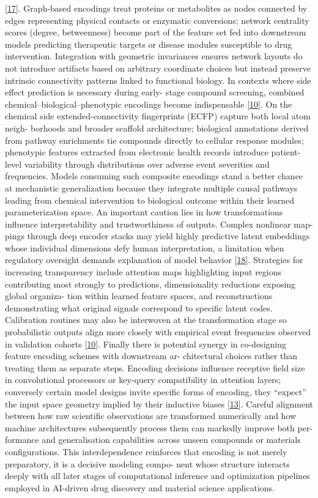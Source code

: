\documentclass[
]{article}
\begin{document}
{[}\hyperref[_bookmark57]{17}{]}. Graph-based encodings treat proteins
or metabolites as nodes connected by edges representing physical
contacts or enzymatic conversions; network centrality scores (degree,
betweenness) become part of the feature set fed into downstream models
predicting therapeutic targets or disease modules susceptible to drug
intervention. Integration with geometric invariances ensures network
layouts do not introduce artifacts based on arbitrary coordinate choices
but instead preserve intrinsic connectivity patterns linked to
functional biology. In contexts where side effect prediction is
necessary during early- stage compound screening, combined
chemical--biological--phenotypic encodings become indispensable
{[}\hyperref[_bookmark50]{10}{]}. On the chemical side
extended-connectivity fingerprints (ECFP) capture both local atom neigh-
borhoods and broader scaffold architecture; biological annotations
derived from pathway enrichments tie compounds directly to cellular
response modules; phenotypic features extracted from electronic health
records introduce patient-level variability through distributions over
adverse event severities and frequencies. Models consuming such
composite encodings stand a better chance at mechanistic generalization
because they integrate multiple causal pathways leading from chemical
intervention to biological outcome within their learned parameterization
space. An important caution lies in how transformations influence
interpretability and trustworthiness of outputs. Complex nonlinear map-
pings through deep encoder stacks may yield highly predictive latent
embeddings whose individual dimensions defy human interpretation, a
limitation when regulatory oversight demands explanation of model
behavior {[}\hyperref[_bookmark58]{18}{]}. Strategies for increasing
transparency include attention maps highlighting input regions
contributing most strongly to predictions, dimensionality reductions
exposing global organiza- tion within learned feature spaces, and
reconstructions demonstrating what original signals correspond to
specific latent codes. Calibration routines may also be interwoven at
the transformation stage so probabilistic outputs align more closely
with empirical event frequencies observed in validation cohorts
{[}\hyperref[_bookmark50]{10}{]}. Finally there is potential synergy in
co-designing feature encoding schemes with downstream ar- chitectural
choices rather than treating them as separate steps. Encoding decisions
influence receptive field size in convolutional processors or key-query
compatibility in attention layers; conversely certain model designs
invite specific forms of encoding, they ``expect'' the input space
geometry implied by their inductive biases
{[}\hyperref[_bookmark53]{13}{]}. Careful alignment between how raw
scientific observations are transformed numerically and how machine
architectures subsequently process them can markedly improve both per-
formance and generalisation capabilities across unseen compounds or
materials configurations. This interdependence reinforces that encoding
is not merely preparatory, it is a decisive modeling compo- nent whose
structure interacts deeply with all later stages of computational
inference and optimization pipelines employed in AI-driven drug
discovery and material science applications.
\end{document}
